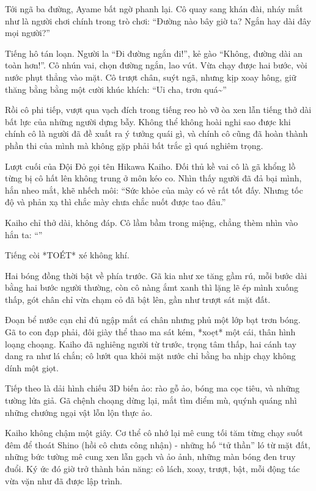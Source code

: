 \documentclass[../main.tex]{subfiles}
\begin{document}
Tới ngã ba đường, Ayame bất ngờ phanh lại. Cô quay sang khán đài, nháy mắt như là người chơi chính trong trò chơi: ``Đường nào bây giờ ta? Ngắn hay dài đây mọi người?''

Tiếng hô tán loạn. Người la ``Đi đường ngắn đi!'', kẻ gào ``Không, đường dài an toàn hơn!''. Cô nhún vai, chọn đường ngắn, lao vút. Vừa chạy được hai bước, vòi nước phụt thẳng vào mặt. Cô trượt chân, suýt ngã, nhưng kịp xoay hông, giữ thăng bằng bằng một cười khúc khích: ``Ui cha, trơn quá\~{}''

Rồi cô phi tiếp, vượt qua vạch đích trong tiếng reo hò vỡ òa xen lẫn tiếng thở dài bất lực của những người dựng bẫy. Không thể không hoài nghi sao được khi chính cô là người đã đề xuất ra ý tưởng quái gì, và chính cô cũng đã hoàn thành phần thi của mình mà không gặp phải bất trắc gì quá nghiêm trọng.

Lượt cuối của Đội Đỏ gọi tên Hikawa Kaiho. Đối thủ kề vai cô là gã khổng lồ từng bị cô hất lên không trung ở môn kéo co. Nhìn thấy người đã đả bại mình, hắn nheo mắt, khẽ nhếch môi:  ``Sức khỏe của mày có vẻ rất tốt đấy. Nhưng tốc độ và phản xạ thì chắc mày chưa chắc nuốt được tao đâu.''

Kaiho chỉ thở dài, không đáp. Cô lầm bầm trong miệng, chẳng thèm nhìn vào hắn ta: ``\textit{}''

Tiếng còi *TOÉT* xé không khí.

Hai bóng đồng thời bật về phía trước. Gã kia như xe tăng gầm rú, mỗi bước dài bằng hai bước người thường, còn cô nàng ắmt xanh thì lặng lẽ ép mình xuống thấp, gót chân chỉ vừa chạm cỏ đã bật lên, gần như trượt sát mặt đất.

Đoạn bể nước cạn chỉ đủ ngập mắt cá chân nhưng phủ một lớp bạt trơn bóng. Gã to con đạp phải, đôi giày thể thao ma sát kém, *xoẹt* một cái, thân hình loạng choạng. Kaiho đã nghiêng người từ trước, trọng tâm thấp, hai cánh tay dang ra như lá chắn; cô lướt qua khỏi mặt nước chỉ bằng ba nhịp chạy không dính một giọt.

Tiếp theo là dải hình chiếu 3D biến ảo: rào gỗ ảo, bóng ma cọc tiêu, và những tường lửa giả. Gã chệnh choạng dừng lại, mắt tìm điểm mù, quýnh quáng nhì những chướng ngại vật lỗn lộn thực ảo.

Kaiho không chậm một giây. Cơ thể cô nhớ lại mê cung tối tăm từng chạy suốt đêm để thoát Shino (hồi cô chưa công nhận) - những hố ``tử thần'' ló từ mặt đất, những bức tường mê cung xen lẫn gạch và ảo ảnh, những màn bóng đen truy đuổi. Ký ức đó giờ trở thành bản năng: cô lách, xoay, trượt, bật, mỗi động tác vừa vặn như đã được lập trình.
\end{document}

